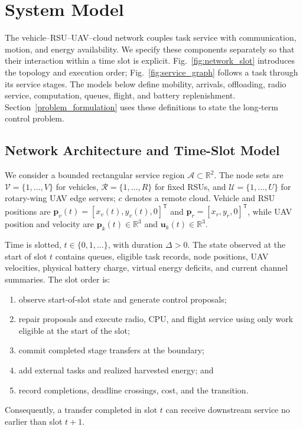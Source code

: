 \section{System Model}
\label{system_model}

The vehicle--RSU--UAV--cloud network couples task service with communication,
motion, and energy availability. We specify these components separately so
that their interaction within a time slot is explicit.
Fig.~\ref{fig:network_slot} introduces the topology and execution order;
Fig.~\ref{fig:service_graph} follows a task through its service stages.
The models below define mobility, arrivals, offloading, radio service,
computation, queues, flight, and battery replenishment.
Section~\ref{problem_formulation} uses these definitions to state the
long-term control problem.

\subsection{Network Architecture and Time-Slot Model}
\label{subsec:network_model}
We consider a bounded rectangular service region
$\mathcal A\subset\mathbb R^2$. The node sets are
$\mathcal V=\{1,\ldots,V\}$ for vehicles,
$\mathcal R=\{1,\ldots,R\}$ for fixed RSUs, and
$\mathcal U=\{1,\ldots,U\}$ for rotary-wing UAV edge servers;
$c$ denotes a remote cloud. Vehicle and RSU positions are
$\boldsymbol p_v(t)=[x_v(t),y_v(t),0]^{\mathsf T}$ and
$\boldsymbol p_r=[x_r,y_r,0]^{\mathsf T}$, while UAV position and
velocity are $\boldsymbol p_k(t)\in\mathbb R^3$ and
$\boldsymbol u_k(t)\in\mathbb R^3$.

Time is slotted, $t\in\{0,1,\ldots\}$, with duration $\Delta>0$.
The state observed at the start of slot $t$ contains queues, eligible
task records, node positions, UAV velocities, physical battery charge,
virtual energy deficits, and current channel summaries. The slot order is:
\begin{enumerate}
\item observe start-of-slot state and generate control proposals;
\item repair proposals and execute radio, CPU, and flight service using
only work eligible at the start of the slot;
\item commit completed stage transfers at the boundary;
\item add external tasks and realized harvested energy; and
\item record completions, deadline crossings, cost, and the transition.
\end{enumerate}
Consequently, a transfer completed in slot $t$ can receive downstream
service no earlier than slot $t+1$.

